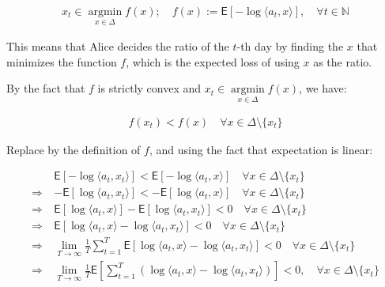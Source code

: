 \documentclass{article}
\begin{document}
\begin{align*}
    x_{t} \in \underset{x \in \Delta}{\operatorname{argmin}} f (x); \quad f (x) := \mathsf{E} \left[ - \log \langle a_t, x \rangle \right] , \quad \forall t \in \mathbb{N} 
\end{align*}

This means that Alice decides the ratio of the $t$-th day by finding the $x$ that minimizes the function $f$, which is the expected loss of using $x$ as the ratio.
\bigskip

By the fact that $f$ is strictly convex and $x_{t} \in \underset{x \in \Delta}{\operatorname{argmin}} f (x)$, we have:

\begin{align*}
    f (x_t) < f (x) \quad \forall x \in \Delta \setminus \{ x_t \} 
\end{align*}

Replace by the definition of $f$, and using the fact that expectation is linear:

\begin{align*}
    &\mathsf{E} \left[ - \log \langle a_t, x_t \rangle \right] < \mathsf{E} \left[ - \log \langle a_t, x \rangle \right] \quad \forall x \in \Delta \setminus \{ x_t \} \\
    \Rightarrow \ &- \mathsf{E} \left[ \log \langle a_t, x_t \rangle \right] < - \mathsf{E} \left[ \log \langle a_t, x \rangle \right] \quad \forall x \in \Delta \setminus \{ x_t \} \\
    \Rightarrow \ &\mathsf{E} \left[ \log \langle a_t, x \rangle \right] - \mathsf{E} \left[ \log \langle a_t, x_t \rangle \right] < 0 \quad \forall x \in \Delta \setminus \{ x_t \} \\
    \Rightarrow \ &\mathsf{E} \left[ \log \langle a_t, x \rangle - \log \langle a_t, x_t \rangle \right] < 0 \quad \forall x \in \Delta \setminus \{ x_t \} \\
    \Rightarrow \ &\lim_{T \to \infty} \frac{1}{T} \sum_{t = 1}^T \mathsf{E} \left[ \log \langle a_t, x \rangle - \log \langle a_t, x_t \rangle \right] < 0 \quad \forall x \in \Delta \setminus \{ x_t \} \\
    \Rightarrow \ &\lim_{T \to \infty} \frac{1}{T} \mathsf{E} \left[ \sum_{t = 1}^T \left( \log \langle a_t, x \rangle - \log \langle a_t, x_t \rangle \right) \right] < 0 ,  \quad \forall x \in \Delta \setminus \{ x_t \}
\end{align*}
\end{document}
